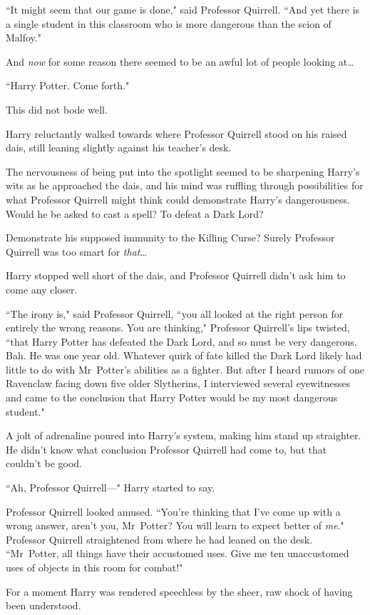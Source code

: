 ``It might seem that our game is done," said Professor Quirrell. ``And yet there is a single student in this classroom who is more dangerous than the scion of Malfoy."

And \emph{now} for some reason there seemed to be an awful lot of people looking at{\ldots}

``Harry Potter. Come forth."

This did not bode well.

Harry reluctantly walked towards where Professor Quirrell stood on his raised dais, still leaning slightly against his teacher's desk.

The nervousness of being put into the spotlight seemed to be sharpening Harry's wits as he approached the dais, and his mind was ruffling through possibilities for what Professor Quirrell might think could demonstrate Harry's dangerousness. Would he be asked to cast a spell? To defeat a Dark Lord?

Demonstrate his supposed immunity to the Killing Curse? Surely Professor Quirrell was too smart for \emph{that}{\ldots}

Harry stopped well short of the dais, and Professor Quirrell didn't ask him to come any closer.

``The irony is," said Professor Quirrell, ``you all looked at the right person for entirely the wrong reasons. You are thinking," Professor Quirrell's lips twisted, ``that Harry Potter has defeated the Dark Lord, and so must be very dangerous. Bah. He was one year old. Whatever quirk of fate killed the Dark Lord likely had little to do with Mr~Potter's abilities as a fighter. But after I heard rumors of one Ravenclaw facing down five older Slytherins, I interviewed several eyewitnesses and came to the conclusion that Harry Potter would be my most dangerous student."

A jolt of adrenaline poured into Harry's system, making him stand up straighter. He didn't know what conclusion Professor Quirrell had come to, but that couldn't be good.

``Ah, Professor Quirrell—" Harry started to say.

Professor Quirrell looked amused. ``You're thinking that I've come up with a wrong answer, aren't you, Mr~Potter? You will learn to expect better of \emph{me}." Professor Quirrell straightened from where he had leaned on the desk. ``Mr~Potter, all things have their accustomed uses. Give me ten unaccustomed uses of objects in this room for combat!"

For a moment Harry was rendered speechless by the sheer, raw shock of having been understood.

